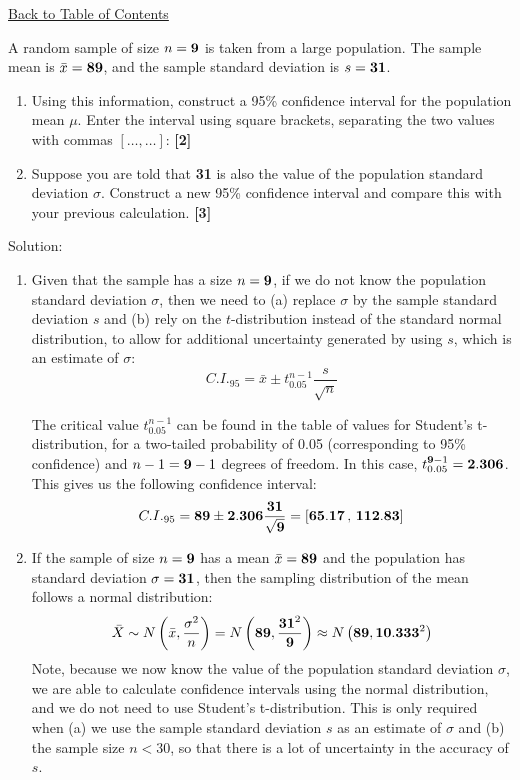 \documentclass[a4paper, leqno, 12pt]{report}
\newenvironment{top_enumerate}{
\begin{enumerate}
  \setlength{\itemsep}{2em}
  \setlength{\topsep}{-0pt}
  \setlength{\partopsep}{-0pt}
}{\end{enumerate}}
\begin{document}
\hyperlink{contents}{Back to Table of Contents}
\begin{top_enumerate}
\item A random sample of size $n={\bf 9}$ is taken from a large population. The sample mean is $\bar x = {\bf 89}$, and the sample standard deviation is $s = {\bf 31}$.
 
\setcounter{equation}{0}  %
\begin{enumerate}
	\setlength{\topsep}{-0pt}
	\setlength{\partopsep}{-0pt}
	\setlength{\itemsep}{10pt}
			\item Using this information, construct a 95\% confidence interval for the population mean $\mu$. Enter the interval using square brackets, separating the two values with commas $\left[\dots ,\dots \right]$:
	 \quad \textbf{[2]}
		\item Suppose you are told that {\bf 31} is also the value of the population standard deviation $\sigma$. Construct a new 95\% confidence interval and compare this with your previous calculation.
	 \quad \textbf{[3]}
\end{enumerate}\addtocounter{enumi}{-1}
\item Solution:
 
\setcounter{equation}{0}  %
\begin{enumerate}
	\setlength{\topsep}{-0pt}
	\setlength{\partopsep}{-0pt}
	\setlength{\itemsep}{10pt}
			\item Given that the sample has a size $n={\bf 9}$, if we do not know the population standard deviation $\sigma$, then we need to (a) replace $\sigma$ by the sample standard deviation $s$ and (b) rely on the $t$-distribution instead of the standard normal distribution, to allow for additional uncertainty generated by using $s$, which is an estimate of $\sigma$:
	\[
	C.I._{95} = \bar x \pm t_{0.05}^{n-1} \frac{s}{\sqrt{n}}
	\]
	
	The critical value $t_{0.05}^{n-1}$ can be found in the table of values for Student's t-distribution, for a two-tailed probability of 0.05 (corresponding to 95\% confidence) and $n-1 = {{\bf 9}-1}$ degrees of freedom. In this case, $t_{0.05}^{{\bf 9}-1} = {\bf 2.306}$. This gives us the following confidence interval:
	\[
	C.I._{95} =  {\bf 89} \pm {\bf 2.306}\frac{{\bf 31}}{\sqrt{{\bf 9}}}  =  \left[{\bf 65.17} \, , \, {\bf 112.83}\right]
	\]
	 \quad \textbf{}
		\item If the sample of size $n={\bf 9}$ has a mean $\bar x = {\bf 89}$ and the population has standard deviation $\sigma={\bf 31}$, then the sampling distribution of the mean follows a normal distribution:
	\[
	\bar X \sim N \left(\bar x,\frac{\sigma^2}{n}\right) = N \left({\bf 89},\frac{{\bf 31}^2}{{\bf 9}}\right) \approx N \left({\bf 89},{\bf 10.333}^2\right)
	\]
	Note, because we now know the value of the population standard deviation $\sigma$, we are able to calculate confidence intervals using the normal distribution, and we do not need to use Student's t-distribution. This is only required when (a) we use the sample standard deviation $s$ as an estimate of $\sigma$ and (b) the sample size $n<30$, so that there is a lot of uncertainty in the accuracy of $s$.
	

\end{enumerate}
\end{top_enumerate}
\end{document}
